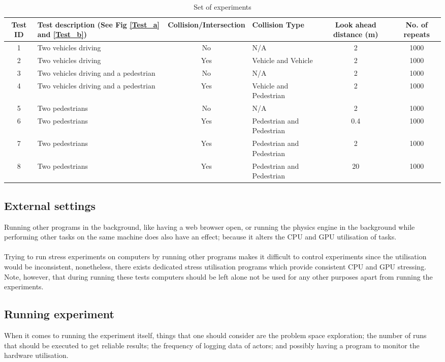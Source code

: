 \begin{table*}[b]
\centering
\begin{tabular}{clclcc}
\toprule
Test ID & Test description (See Fig \ref{Test_a} and \ref{Test_b}) & Collision/Intersection & Collision Type & Look ahead distance (m) & No. of repeats \\ \midrule
1       & Two vehicles driving                   & No  & N/A & 2 & 1000 \\
2       & Two vehicles driving                   & Yes & Vehicle and Vehicle & 2 & 1000 \\
3       & Two vehicles driving and a pedestrian  & No  & N/A & 2 & 1000 \\
4       & Two vehicles driving and a pedestrian  & Yes & Vehicle and Pedestrian & 2 & 1000 \\
5       & Two pedestrians                        & No  & N/A & 2 & 1000 \\
6       & Two pedestrians                        & Yes & Pedestrian and Pedestrian & 0.4 & 1000 \\
7       & Two pedestrians                        & Yes & Pedestrian and Pedestrian & 2 & 1000 \\
8       & Two pedestrians                        & Yes & Pedestrian and Pedestrian & 20 & 1000 \\
\bottomrule
\end{tabular}
\caption{Set of experiments}
\label{TableOfExperiments}
\end{table*}

\subsection{External settings}
\noindent Running other programs in the background, like having a web browser open, or running the physics engine in the background while performing other tasks on the same machine does also have an effect; because it alters the CPU and GPU utilisation of tasks.\\\\ 
\noindent Trying to run stress experiments on computers by running other programs makes it difficult to control experiments since the utilisation would be inconsistent, nonetheless, there exists dedicated stress utilisation programs which provide consistent CPU and GPU stressing. Note, however, that during running these tests computers should be left alone not be used for any other purposes apart from running the experiments.

\subsection{Running experiment}
\noindent When it comes to running the experiment itself, things that one should consider  are the problem space exploration; the number of runs that should be executed to get reliable results; the frequency of logging data of actors; and possibly having a program to monitor the hardware utilisation.

